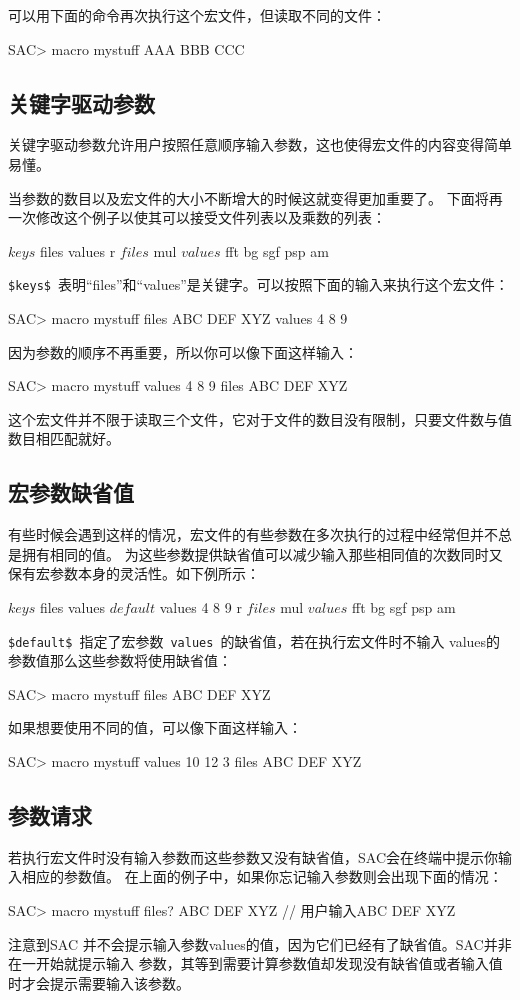 可以用下面的命令再次执行这个宏文件，但读取不同的文件：
\begin{SACCode}
SAC> macro mystuff AAA BBB CCC
\end{SACCode}

\subsection{关键字驱动参数}
关键字驱动参数允许用户按照任意顺序输入参数，这也使得宏文件的内容变得简单易懂。

当参数的数目以及宏文件的大小不断增大的时候这就变得更加重要了。
下面将再一次修改这个例子以使其可以接受文件列表以及乘数的列表：
\begin{SACCode}
$keys$ files values
r $files$
mul $values$
fft
bg sgf
psp am
\end{SACCode}
\lstinline{$keys$}~表明``files''和``values''是关键字。可以按照下面的输入来执行这个宏文件：
\begin{SACCode}
SAC> macro mystuff files ABC DEF XYZ values 4 8 9
\end{SACCode}
因为参数的顺序不再重要，所以你可以像下面这样输入：
\begin{SACCode}
SAC> macro mystuff values 4 8 9 files ABC DEF XYZ
\end{SACCode}
这个宏文件并不限于读取三个文件，它对于文件的数目没有限制，只要文件数与值数目相匹配就好。

\subsection{宏参数缺省值}
有些时候会遇到这样的情况，宏文件的有些参数在多次执行的过程中经常但并不总是拥有相同的值。
为这些参数提供缺省值可以减少输入那些相同值的次数同时又保有宏参数本身的灵活性。如下例所示：
\begin{SACCode}
$keys$ files values
$default$ values 4 8 9
r $files$
mul $values$
fft
bg sgf
psp am
\end{SACCode}
\lstinline{$default$}~指定了宏参数~\lstinline{values}~的缺省值，若在执行宏文件时不输入
values的参数值那么这些参数将使用缺省值：
\begin{SACCode}
SAC> macro mystuff files ABC DEF XYZ 
\end{SACCode}
如果想要使用不同的值，可以像下面这样输入：
\begin{SACCode}
SAC> macro mystuff values 10 12 3 files ABC DEF XYZ
\end{SACCode}

\subsection{参数请求}
若执行宏文件时没有输入参数而这些参数又没有缺省值，SAC会在终端中提示你输入相应的参数值。
在上面的例子中，如果你忘记输入参数则会出现下面的情况：
\begin{SACCode}
SAC> macro mystuff
files? ABC DEF XYZ          // 用户输入ABC DEF XYZ
\end{SACCode}
注意到SAC 并不会提示输入参数values的值，因为它们已经有了缺省值。SAC并非在一开始就提示输入
参数，其等到需要计算参数值却发现没有缺省值或者输入值时才会提示需要输入该参数。

